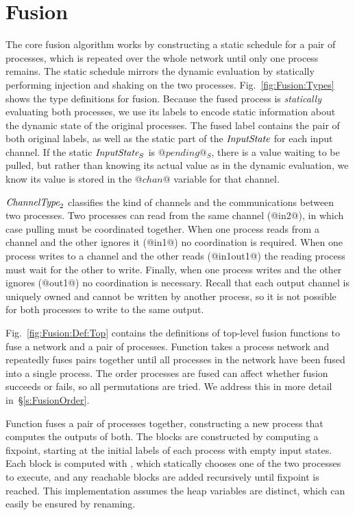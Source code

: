 \section{Fusion}
\label{s:Fusion}



The core fusion algorithm works by constructing a static schedule for a pair of processes, which is repeated over the whole network until only one process remains.
The static schedule mirrors the dynamic evaluation by statically performing injection and shaking on the two processes.
Fig.~\ref{fig:Fusion:Types} shows the type definitions for fusion.
Because the fused process is \emph{statically} evaluating both processes, we use its labels to encode static information about the dynamic state of the original processes.
The fused label contains the pair of both original labels, as well as the static part of the $\textit{InputState}$ for each input channel.
If the static $\textit{InputState}_S$ is $@pending@_S$, there is a value waiting to be pulled, but rather than knowing its actual value as in the dynamic evaluation, we know its value is stored in the $@chan@$ variable for that channel.

$\textit{ChannelType}_2$ classifies the kind of channels and the communications between two processes.
Two processes can read from the same channel (@in2@), in which case pulling must be coordinated together.
When one process reads from a channel and the other ignores it (@in1@) no coordination is required.
When one process writes to a channel and the other reads (@in1out1@) the reading process must wait for the other to write.
Finally, when one process writes and the other ignores (@out1@) no coordination is necessary.
Recall that each output channel is uniquely owned and cannot be written by another process, so it is not possible for both processes to write to the same output.





Fig.~\ref{fig:Fusion:Def:Top} contains the definitions of top-level fusion functions to fuse a network and a pair of processes.
Function  takes a process network and repeatedly fuses pairs together until all processes in the network have been fused into a single process.
The order processes are fused can affect whether fusion succeeds or fails, so all permutations are tried.
We address this in more detail in~\S\ref{s:FusionOrder}.

Function  fuses a pair of processes together, constructing a new process that computes the outputs of both.
The blocks are constructed by computing a fixpoint, starting at the initial labels of each process with empty input states.
Each block is computed with , which statically chooses one of the two processes to execute, and any reachable blocks are added recursively until fixpoint is reached.
This implementation assumes the heap variables are distinct, which can easily be ensured by renaming.

